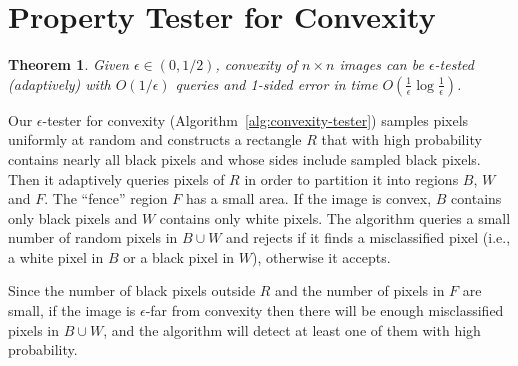 \documentclass[11pt,english]{article}
\newtheorem{theorem}{Theorem}[section]
\numberwithin{figure}{section}
\newcommand{\eps}{{\epsilon}}
\begin{document}
\section{Property Tester for Convexity}\label{sec:convexity-tester}
\begin{theorem}\label{thm:convexity-tester}
Given $\eps\in(0,1/2)$, convexity of $n\times n$ images can be $\eps$-tested
(adaptively) with $O(1/\eps)$ queries and 1-sided error in time
$O(\frac{1}{\eps} \log
\frac{1}{\eps})$.
\end{theorem}
Our $\eps$-tester for convexity (Algorithm~\ref{alg:convexity-tester})
samples pixels uniformly at random and constructs a rectangle $R$ that with high probability contains nearly all black pixels and whose sides include sampled black pixels.
Then it adaptively queries pixels of $R$ in order to partition it into regions $B$, $W$
and $F$. The ``fence'' region $F$ has a small area. If the image is convex, $B$ contains only black pixels and $W$ contains
only white pixels.  The algorithm queries a small number of random pixels in $B\cup W$ and rejects
if it finds a misclassified pixel (i.e., a white pixel in $B$ or
a black pixel in $W$), otherwise it accepts.

Since the number of black pixels outside $R$ and the number of
pixels in $F$ are small, if the image is $\eps$-far from
convexity then there will be enough misclassified pixels in $B\cup W$, and the algorithm
will detect at least one of them with high probability.
\end{document}
